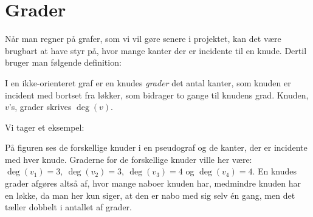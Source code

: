 \section{Grader} \label{sec:grader}
Når man regner på grafer, som vi vil gøre senere i projektet, kan det være brugbart at have styr på, hvor mange kanter der er incidente til en knude. Dertil bruger man følgende definition:

\begin{defn}[Grader] \label{defn:grader}
I en ikke-orienteret graf er en knudes \emph{grader} det antal kanter, som knuden er incident med bortset fra løkker, som bidrager to gange til knudens grad. Knuden, $v$'s, grader skrives $\deg(v)$.
\end{defn}

Vi tager et eksempel:



På figuren ses de forskellige knuder i en pseudograf og de kanter, der er incidente med hver knude. Graderne for de forskellige knuder ville her være: $\deg(v_{1})=3, \ \deg(v_{2})=3, \ \deg(v_{3})=4$ og $\deg(v_{4})=4$. En knudes grader afgøres altså af, hvor mange naboer knuden har, medmindre knuden har en løkke, da man her kun siger, at den er nabo med sig selv én gang, men det tæller dobbelt i antallet af grader.